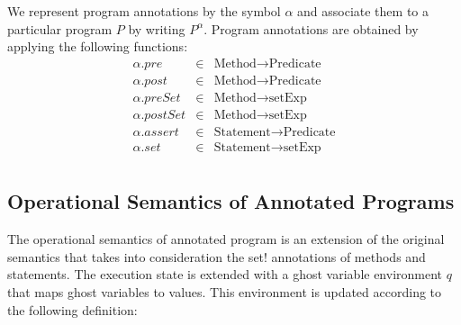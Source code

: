 \documentclass[10pt,notitlepage,twoside]{article}
\newcommand{\pre}{\mathit{pre}}
\newcommand{\post}{\mathit{post}}
\begin{document}
We represent program annotations by the symbol $\alpha$ and associate them to a particular program $P$ by writing $P^\alpha$.
Program annotations are obtained by applying the following functions:
\begin{displaymath}
\begin{array}{rcl}

\alpha.\pre & \in & \textrm{Method} \rightarrow \textrm{Predicate} \\
\alpha.\post & \in & \textrm{Method} \rightarrow \textrm{Predicate} \\
\alpha.\mathit{preSet} & \in & \textrm{Method} \rightarrow \textrm{setExp} \\
\alpha.\mathit{postSet} & \in & \textrm{Method} \rightarrow \textrm{setExp} \\
\hline
\alpha.\mathit{assert} & \in & \textrm{Statement} \rightarrow \textrm{Predicate} \\
\alpha.\mathit{set} & \in & \textrm{Statement} \rightarrow \textrm{setExp} \\
\end{array}
\end{displaymath}


\subsection{Operational Semantics of Annotated Programs}

The operational semantics of annotated program is an extension of the original semantics that takes into consideration the set! annotations of methods and statements. 
The execution state is extended with a ghost variable environment $q$ that maps ghost variables to values. This environment is updated according to the following definition:
\end{document}
